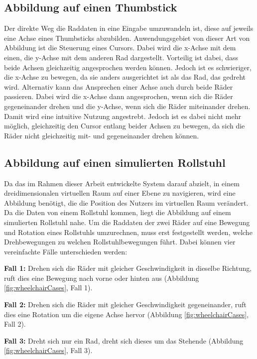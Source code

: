 \subsection{Abbildung auf einen Thumbstick}
Der direkte Weg die Raddaten in eine Eingabe umzuwandeln ist, diese auf jeweils eine Achse eines Thumbsticks abzubilden.
Anwendungsgebiet von dieser Art von Abbildung ist die Steuerung eines Cursors.
Dabei wird die x-Achse mit dem einen, die y-Achse mit dem anderen Rad dargestellt.
Vorteilig ist dabei, dass beide Achsen gleichzeitig angesprochen werden können.
Jedoch ist es schwieriger, die x-Achse zu bewegen, da sie anders ausgerichtet ist als das Rad, das gedreht wird.
Alternativ kann das Ansprechen einer Achse auch durch beide Räder passieren.
Dabei wird die x-Achse dann angesprochen, wenn sich die Räder gegeneinander drehen und die y-Achse, wenn sich die Räder miteinander drehen.
Damit wird eine intuitive Nutzung angestrebt.
Jedoch ist es dabei nicht mehr möglich, gleichzeitig den Cursor entlang beider Achsen zu bewegen, da sich die Räder nicht gleichzeitig mit- und gegeneinander drehen können.

\subsection{Abbildung auf einen simulierten Rollstuhl}
Da das im Rahmen dieser Arbeit entwickelte System darauf abzielt, in einem dreidimensionalen virtuellen Raum auf einer Ebene zu navigieren, wird eine Abbildung benötigt, die die Position des Nutzers im virtuellen Raum verändert.
Da die Daten von einem Rollstuhl kommen, liegt die Abbildung auf einem simulierten Rollstuhl nahe.
Um die Raddaten der zwei Räder auf eine Bewegung und Rotation eines Rollstuhls umzurechnen, muss erst festgestellt werden, welche Drehbewegungen zu welchen Rollstuhlbewegungen führt.
Dabei können vier vereinfachte Fälle unterschieden werden:



\textbf{Fall 1:} Drehen sich die Räder mit gleicher Geschwindigkeit in dieselbe Richtung, ruft dies eine Bewegung nach vorne oder hinten aus (Abbildung \ref{fig:wheelchairCases}, Fall 1).

\textbf{Fall 2:} Drehen sich die Räder mit gleicher Geschwindigkeit gegeneinander, ruft dies eine Rotation um die eigene Achse hervor (Abbildung \ref{fig:wheelchairCases}, Fall 2).

\textbf{Fall 3:} Dreht sich nur ein Rad, dreht sich dieses um das Stehende (Abbildung \ref{fig:wheelchairCases}, Fall 3).

